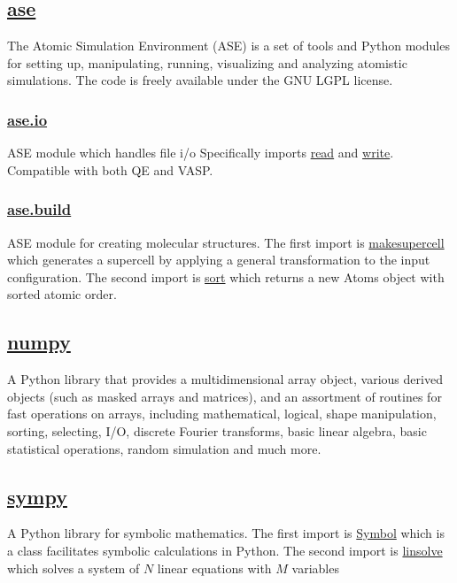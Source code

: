 \documentclass[12pt]{article}
\begin{document}
\subsection*{\href{https://wiki.fysik.dtu.dk/ase/}{ase}}
The Atomic Simulation Environment (ASE) is a set of tools and Python modules for setting up, manipulating, running, visualizing and analyzing atomistic simulations. The code is freely available under the GNU LGPL license.

    \subsubsection*{\href{https://wiki.fysik.dtu.dk/ase/ase/io/io.html\#module-ase.io}{ase.io}}
    ASE module which handles file i/o Specifically imports \href{https://wiki.fysik.dtu.dk/ase/ase/io/io.html#ase.io.read}{read} and \href{https://wiki.fysik.dtu.dk/ase/ase/io/io.html#ase.io.write}{write}. Compatible with both QE and VASP. 
    
    \subsubsection*{\href{https://wiki.fysik.dtu.dk/ase/ase/build/build.html?highlight=build\#module-ase.build}{ase.build}}
    ASE module for creating molecular structures. The first import is \href{https://wiki.fysik.dtu.dk/ase/ase/build/tools.html?highlight=make_supercell#ase.build.make_supercell}{make\textunderscore supercell} which generates a supercell by applying a general transformation to the input configuration. The second import is \href{https://wiki.fysik.dtu.dk/ase/ase/build/tools.html?highlight=sort#ase.build.sort}{sort} which returns a new Atoms object with sorted atomic order.

\subsection*{\href{https://numpy.org/doc/stable/}{numpy}}
A Python library that provides a multidimensional array object, various derived objects (such as masked arrays and matrices), and an assortment of routines for fast operations on arrays, including mathematical, logical, shape manipulation, sorting, selecting, I/O, discrete Fourier transforms, basic linear algebra, basic statistical operations, random simulation and much more.

\subsection*{\href{https://docs.sympy.org/latest/index.html}{sympy}}
A Python library for symbolic mathematics. The first import is \href{https://docs.sympy.org/latest/modules/core.html?highlight=symbol#module-sympy.core.symbol}{Symbol} which is a class facilitates symbolic calculations in Python. The second import is \href{https://docs.sympy.org/latest/modules/solvers/solveset.html?highlight=linsolve#sympy.solvers.solveset.linsolve}{linsolve} which solves a system of $N$ linear equations with $M$ variables
\end{document}
